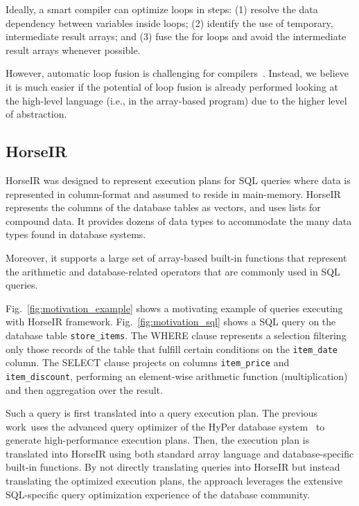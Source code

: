 
Ideally, a smart compiler can optimize loops in steps:
(1) resolve the data dependency between variables inside loops;
(2) identify the use of temporary, intermediate result arrays; and
(3) fuse the for loops and avoid the intermediate result arrays whenever possible.


However, automatic loop fusion is challenging for
compilers~\cite{Kennedy01:FastFusion,Kennedy1993:LoopFusion}.
Instead, we believe it is much easier if the potential of loop fusion is
already performed looking at the high-level language
(i.e., in the array-based program) due to the higher level of abstraction.

\subsection{HorseIR}

HorseIR \OldPaper was designed to represent execution plans for SQL queries
where data is represented in column-format and assumed to reside in
main-memory. HorseIR represents the columns of the database tables as vectors,
and uses lists for compound data. It provides dozens of data types to
accommodate the many data types found in database systems. 

Moreover, it supports a large set of array-based built-in functions that
represent the arithmetic and database-related operators that are commonly used
in SQL queries.

Fig.~\ref{fig:motivation_example} shows a motivating example of queries
executing with HorseIR framework. Fig.~\ref{fig:motivation_sql} shows a SQL
query on the database table \texttt{store\_items}. The WHERE clause represents
a selection filtering only those records of the table that fulfill certain
conditions on the \texttt{item_date} column. The SELECT clause projects on
columns \texttt{item_price} and \texttt{item\_discount}, performing an
element-wise arithmetic function (multiplication) and then aggregation over the
result. 



Such a query is first translated into a query execution plan. The previous
work~\OldPaper uses the advanced query optimizer of the HyPer database
system~\cite{Neumann2011:HyPer} to generate high-performance execution plans.
Then, the execution plan is translated into HorseIR using both standard array
language and database-specific built-in functions. By not directly translating
queries into HorseIR but instead translating the optimized execution plans, the
approach leverages the extensive SQL-specific query optimization experience of
the database community.

